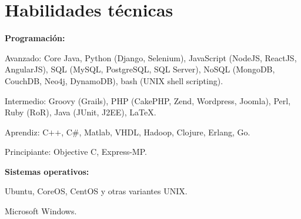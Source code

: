 


\section{Habilidades t\'ecnicas}
%
\textbf{Programaci\'on:}

    \begin{innerlist}
\item Avanzado: Core Java, Python (Django, Selenium), JavaScript
(NodeJS, ReactJS, AngularJS), SQL (MySQL, PostgreSQL,
SQL Server), NoSQL (MongoDB, CouchDB, Neo4j, DynamoDB), bash (UNIX shell
scripting).
\item Intermedio: Groovy (Grails), PHP
(CakePHP, Zend, Wordpress, Joomla), Perl, Ruby (RoR), 
Java (JUnit, J2EE), \LaTeX{}.
\item Aprendiz: C$+$$+$, C\#, Matlab, VHDL, Hadoop, Clojure,
Erlang, Go.
\item Principiante: Objective C, Express-MP.
    \end{innerlist}

\halfblankline

\textbf{Sistemas operativos:}
    \begin{innerlist}
\item Ubuntu, CoreOS, CentOS y otras variantes UNIX.
\item Microsoft Windows.
    \end{innerlist}
    
\halfblankline

